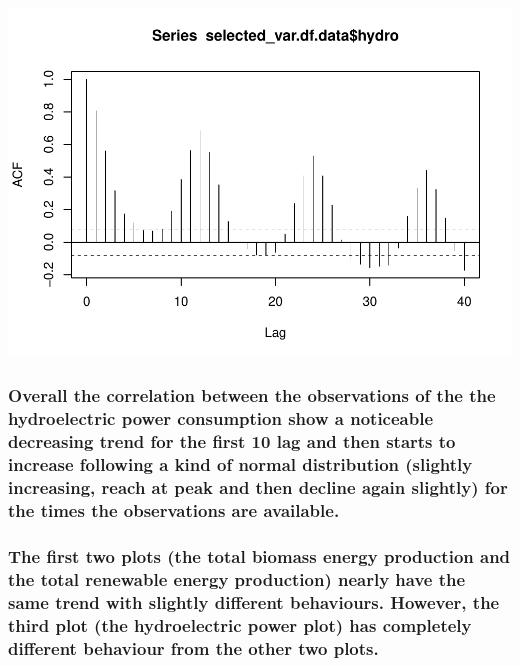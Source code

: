 \documentclass[
]{article}
\begin{document}
\includegraphics{YaredAsfaw_TSA_A02_Sp22_files/figure-latex/unnamed-chunk-20-1.pdf}

\hypertarget{overall-the-correlation-between-the-observations-of-the-the-hydroelectric-power-consumption-show-a-noticeable-decreasing-trend-for-the-first-10-lag-and-then-starts-to-increase-following-a-kind-of-normal-distribution-slightly-increasing-reach-at-peak-and-then-decline-again-slightly-for-the-times-the-observations-are-available.}{%
\subsubsection{Overall the correlation between the observations of the
the hydroelectric power consumption show a noticeable decreasing trend
for the first 10 lag and then starts to increase following a kind of
normal distribution (slightly increasing, reach at peak and then decline
again slightly) for the times the observations are
available.}\label{overall-the-correlation-between-the-observations-of-the-the-hydroelectric-power-consumption-show-a-noticeable-decreasing-trend-for-the-first-10-lag-and-then-starts-to-increase-following-a-kind-of-normal-distribution-slightly-increasing-reach-at-peak-and-then-decline-again-slightly-for-the-times-the-observations-are-available.}}

\hypertarget{the-first-two-plots-the-total-biomass-energy-production-and-the-total-renewable-energy-production-nearly-have-the-same-trend-with-slightly-different-behaviours.-however-the-third-plot-the-hydroelectric-power-plot-has-completely-different-behaviour-from-the-other-two-plots.}{%
\subsubsection{The first two plots (the total biomass energy production
and the total renewable energy production) nearly have the same trend
with slightly different behaviours. However, the third plot (the
hydroelectric power plot) has completely different behaviour from the
other two
plots.}\label{the-first-two-plots-the-total-biomass-energy-production-and-the-total-renewable-energy-production-nearly-have-the-same-trend-with-slightly-different-behaviours.-however-the-third-plot-the-hydroelectric-power-plot-has-completely-different-behaviour-from-the-other-two-plots.}}
\end{document}
